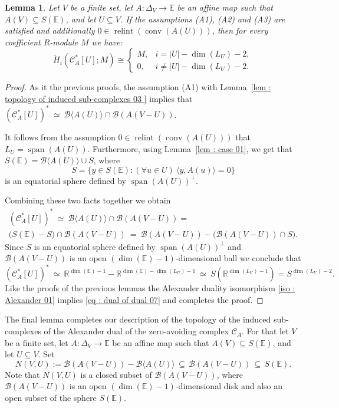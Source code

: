 \documentclass[a4paper,11pt,reqno, english]{amsart}
\newtheorem{lemma}[theorem]{Lemma}
\theoremstyle{definition}
\theoremstyle{remark}
\newcommand\R{\mathbb R}
\newcommand\CC{\mathscr C}
\newcommand\E{\mathbb{E}}
\DeclareMathOperator{\spann}{\mathrm{span}}
\DeclareMathOperator{\relint}{\mathrm{relint}}
\DeclareMathOperator{\conv}{\mathrm{conv}}
\begin{document}
\medskip
\begin{lemma}
	\label{lem : topology of induced sub-complexes 07 }
	Let $V$ be a finite set, let $A\colon \Delta_V\longrightarrow\E$ be an affine map such that $A(V)\subseteq S(\E)$, and let $U\subseteq V$.
	If the assumptions {\rm (A1)}, {\rm (A2)} and {\rm (A3)} are satisfied and additionally $0\in\relint(\conv (A(U)))$, then for every coefficient $R$-module $M$ we have:
	\begin{equation}
		\label{eq : dual of dual 07}
		\widetilde{H}_i(\CC_A^*[U];M)\cong
		\begin{cases}
			M, & i=|U|-\dim(L_U)-2,     \\
			0, & i\neq |U|-\dim(L_U)-2.
		\end{cases}
	\end{equation}
\end{lemma}
\begin{proof}
	As it the previous proofs, the assumption (A1) with Lemma~\ref{lem : topology of induced sub-complexes 03 } implies that
	$
		(\CC_A^*[U])^* \ \simeq \ \mathscr{B}\langle A(U)\rangle\cap \mathscr{B}(A(V-U))
	$.

	\medskip
	It follows from the assumption $0\in\relint(\conv (A(U)))$ that $L_U=\spann(A(U))$.
	Furthermore, using Lemma~\ref{lem :  case 01}, we get that
	$
		S(\E)=\mathscr{B}\langle A(U)\rangle \cup S
	$,
	where
	\[
		S=\{y\in S(\E) : (\forall u\in U)\ \langle y,A(u) \rangle=0 \}
	\]
	is an equatorial sphere defined by ${\spann(A(U))}^{\perp}$.

	\medskip
	Combining these two facts together we obtain
	\begin{multline*}
		(\CC_A^*[U])^* \ \simeq \ \mathscr{B}\langle A(U)\rangle\cap \mathscr{B}(A(V-U))= \\ \big(S(\E)- S\big)\cap \mathscr{B}(A(V-U)) \ = \ \mathscr{B}(A(V-U)) - \big(  \mathscr{B}(A(V-U)) \cap S\big).
	\end{multline*}
	Since $S$ is an equatorial sphere defined by ${\spann(A(U))}^{\perp}$ and $\mathscr{B}(A(V-U))$ is an open $(\dim(\E)-1)$-dimensional ball we conclude that
	\[
		(\CC_A^*[U])^* \ \simeq \ \R^{\dim(\E)-1} - \R^{\dim(\E)-\dim(L_U)-1}  \ \simeq \ S( \R^{\dim(L_U)-1})=S^{\dim(L_U)-2}.
	\]
	Like the proofs of the previous lemmas the Alexander duality isomorphism \eqref{iso : Alexander 01} implies \eqref{eq : dual of dual 07} and completes the proof.
\end{proof}




\medskip
The final lemma completes our description of the topology of the induced sub-complexes of the Alexander dual of the zero-avoiding complex $\CC_A$.
For that let $V$ be a finite set, let $A\colon \Delta_V\longrightarrow\E$ be an affine map such that $A(V)\subseteq S(\E)$, and let $U\subseteq V$.
Set
\[
	N(V,U):=\mathscr{B}(A(V-U))-\mathscr{B}\langle A(U)\rangle \, \subseteq \, \mathscr{B}(A(V-U)) \, \subseteq \, S(\E).
\]
Note that $N(V,U)$ is a closed subset of $\mathscr{B}(A(V-U))$, where $\mathscr{B}(A(V-U))$ is an open $(\dim(\E)-1)$-dimensional disk and also an open subset of the sphere $S(\E)$.
\end{document}
